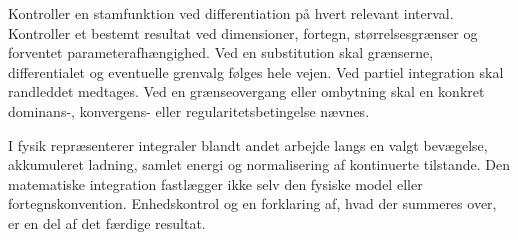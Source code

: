 Kontroller en stamfunktion ved differentiation på hvert relevant interval.
Kontroller et bestemt resultat ved dimensioner, fortegn, størrelsesgrænser
og forventet parameterafhængighed. Ved en substitution skal grænserne,
differentialet og eventuelle grenvalg følges hele vejen. Ved partiel
integration skal randleddet medtages. Ved en grænseovergang eller ombytning
skal en konkret dominans-, konvergens- eller regularitetsbetingelse nævnes.

I fysik repræsenterer integraler blandt andet arbejde langs en valgt
bevægelse, akkumuleret ladning, samlet energi og normalisering af
kontinuerte tilstande. Den matematiske integration fastlægger ikke selv
den fysiske model eller fortegnskonvention. Enhedskontrol og en forklaring
af, hvad der summeres over, er en del af det færdige resultat.
